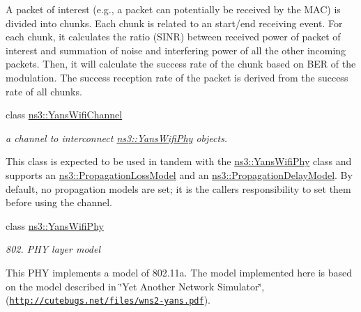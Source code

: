 \begin{DoxyCompactItemize}
\begin{DoxyCompactList}
A packet of interest (e.\+g., a packet can potentially be received by the M\+AC) is divided into chunks. Each chunk is related to an start/end receiving event. For each chunk, it calculates the ratio (S\+I\+NR) between received power of packet of interest and summation of noise and interfering power of all the other incoming packets. Then, it will calculate the success rate of the chunk based on B\+ER of the modulation. The success reception rate of the packet is derived from the success rate of all chunks. \end{DoxyCompactList}\item 
class \hyperlink{classns3_1_1YansWifiChannel}{ns3\+::\+Yans\+Wifi\+Channel}
\begin{DoxyCompactList}\small\item\em a channel to interconnect \hyperlink{classns3_1_1YansWifiPhy}{ns3\+::\+Yans\+Wifi\+Phy} objects.

This class is expected to be used in tandem with the \hyperlink{classns3_1_1YansWifiPhy}{ns3\+::\+Yans\+Wifi\+Phy} class and supports an \hyperlink{classns3_1_1PropagationLossModel}{ns3\+::\+Propagation\+Loss\+Model} and an \hyperlink{classns3_1_1PropagationDelayModel}{ns3\+::\+Propagation\+Delay\+Model}. By default, no propagation models are set; it is the caller\textquotesingle{}s responsibility to set them before using the channel. \end{DoxyCompactList}\item 
class \hyperlink{classns3_1_1YansWifiPhy}{ns3\+::\+Yans\+Wifi\+Phy}
\begin{DoxyCompactList}\small\item\em 802. P\+HY layer model

This P\+HY implements a model of 802.\+11a. The model implemented here is based on the model described in \char`\"{}\+Yet Another Network Simulator\char`\"{}, (\href{http://cutebugs.net/files/wns2-yans.pdf}{\tt http\+://cutebugs.\+net/files/wns2-\/yans.\+pdf}). \end{DoxyCompactList}\end{DoxyCompactItemize}
